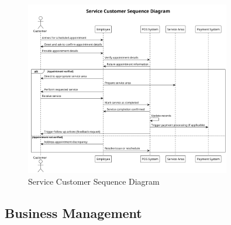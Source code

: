 \documentclass[]{VUMIFTemplateClass}
\begin{document}
\begin{figure}[H]
    \centering
    \includegraphics[width=0.8\textwidth]{images/diagrams/services/service_customer_sequence.png}
    \caption{Service Customer Sequence Diagram}
    \label{fig:service_customer_sequence}
\end{figure}

\subsection{Business Management}


\end{document}
